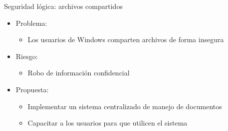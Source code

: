 \documentclass[spanish]{beamer}
\begin{document}
\begin{frame}{Seguridad lógica: archivos compartidos}
  \begin{itemize}
  \item Problema:
    \begin{itemize}
    \item Los usuarios de Windows comparten archivos de forma insegura
    \end{itemize}
  \item Riesgo:
    \begin{itemize}
    \item Robo de información confidencial
    \end{itemize}
  \item Propuesta:
    \begin{itemize}
    \item Implementar un sistema centralizado de manejo de documentos
    \item Capacitar a los usuarios para que utilicen el sistema
    \end{itemize}
  \end{itemize}
\end{frame}
\end{document}
